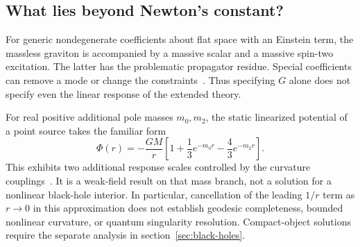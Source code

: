 \subsection{What lies beyond Newton's constant?}

For generic nondegenerate coefficients about flat space with an Einstein term, the massless graviton is accompanied by a massive scalar and a massive spin-two excitation.  The latter has the problematic propagator residue.  Special coefficients can remove a mode or change the constraints~\cite{Stelle:1978}.  Thus specifying $G$ alone does not specify even the linear response of the extended theory.

For real positive additional pole masses $m_0,m_2$, the static linearized potential of a point source takes the familiar form
\begin{equation}
 \Phi(r)=-\frac{GM}{r}\left[1+\frac13e^{-m_0r}
 -\frac43e^{-m_2r}\right].
 \label{eq:quadratic-newtonian-limit}
\end{equation}
This exhibits two additional response scales controlled by the curvature couplings~\cite{Stelle:1978,Salvio:2018}.  It is a weak-field result on that mass branch, not a solution for a nonlinear black-hole interior.  In particular, cancellation of the leading $1/r$ term as $r\to0$ in this approximation does not establish geodesic completeness, bounded nonlinear curvature, or quantum singularity resolution.  Compact-object solutions require the separate analysis in section~\ref{sec:black-holes}.
